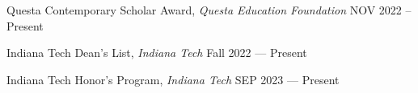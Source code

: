 \begin{documnet}

\skills Questa Contemporary Scholar Award, \textit {Questa Education Foundation} \hfill {NOV 2022 -- Present}

\skills Indiana Tech Dean's List, \textit {Indiana Tech} \hfill {Fall 2022 --- Present}

\skills Indiana Tech Honor's Program, \textit {Indiana Tech} \hfill {SEP 2023 --- Present}

\end{documnet}